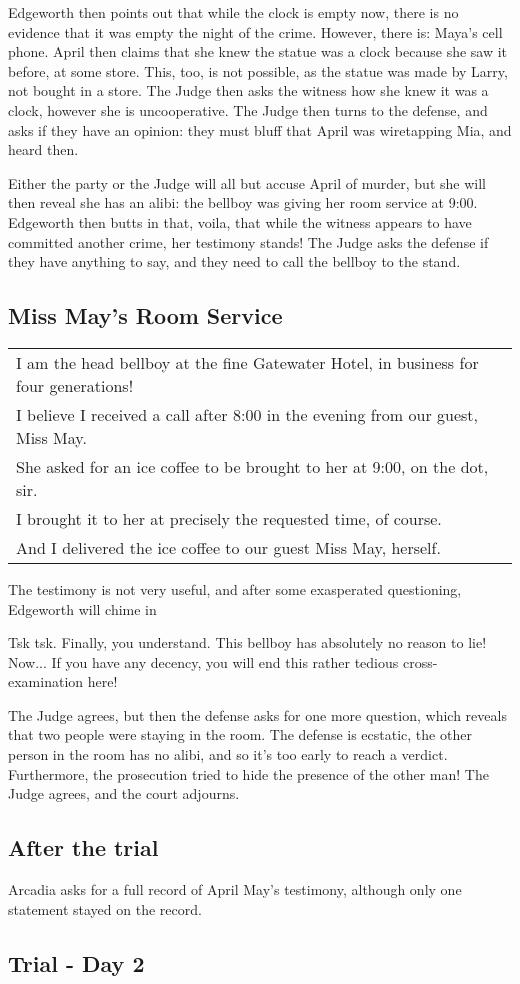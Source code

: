 Edgeworth then points out that while the clock is empty now, there is no evidence that it was empty the night of the crime. However, there is: Maya's cell phone. April then claims that she knew the statue was a clock because she saw it before, at some store. This, too, is not possible, as the statue was made by Larry, not bought in a store. The Judge then asks the witness how she knew it was a clock, however she is uncooperative. The Judge then turns to the defense, and asks if they have an opinion: they must bluff that April was wiretapping Mia, and heard then.

Either the party or the Judge will all but accuse April of murder, but she will then reveal she has an alibi: the bellboy was giving her room service at 9:00. Edgeworth then butts in that, voila, that while the witness appears to have committed another crime, her testimony stands! The Judge asks the defense if they have anything to say, and they need to call the bellboy to the stand.

\subsection{Miss May's Room Service}
\begin{tabular}{p{11cm}}
I am the head bellboy at the fine Gatewater Hotel, in business for four generations!\\
I believe I received a call after 8:00 in the evening from our guest, Miss May.\\
She asked for an ice coffee to be brought to her at 9:00, on the dot, sir.\\
I brought it to her at precisely the requested time, of course.\\
And I delivered the ice coffee to our guest Miss May, herself. \end{tabular}

The testimony is not very useful, and after some exasperated questioning, Edgeworth will chime in 
\begin{center}
Tsk tsk. Finally, you understand. This bellboy has absolutely no reason to lie! Now... If you have any decency, you will end this rather tedious cross-examination here! 
\end{center}

The Judge agrees, but then the defense asks for one more question, which reveals that two people were staying in the room. The defense is ecstatic, the other person in the room has no alibi, and so it's too early to reach a verdict. Furthermore, the prosecution tried to hide the presence of the other man! The Judge agrees, and the court adjourns.

\subsection{After the trial}
Arcadia asks for a full record of April May's testimony, although only one statement stayed on the record.


\subsection{Trial - Day 2}
